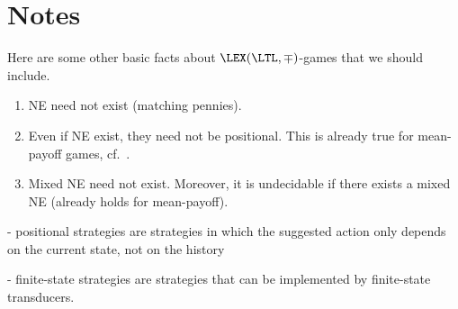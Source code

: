 \section{Notes}

Here are some other basic facts about $\LEX(\LTL,\mp)$-games that we should include.

\begin{enumerate}
 \item NE need not exist (matching pennies).
 \item Even if NE exist, they need not be positional. This is already true for mean-payoff games, cf.~\cite{DBLP:journals/corr/abs-1210-3539}.
 \item Mixed NE need not exist. Moreover, it is undecidable if there exists a mixed NE (already holds for mean-payoff).
\end{enumerate}

- positional strategies are strategies in which the suggested action only depends on the current state, not on the history

- finite-state strategies are strategies that can be implemented by finite-state transducers.